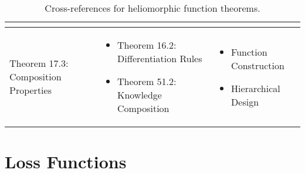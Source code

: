 \begin{table}[h]
\begin{tabular}{|l|p{7cm}|p{4cm}|}
\begin{itemize}
\end{itemize} \\
\hline
Theorem 17.3: Composition Properties &
\begin{itemize}
    \item Theorem 16.2: Differentiation Rules
    \item Theorem 51.2: Knowledge Composition
\end{itemize} &
\begin{itemize}
    \item Function Construction
    \item Hierarchical Design
\end{itemize} \\
\hline
\end{tabular}
\caption{Cross-references for heliomorphic function theorems.}
\label{tab:xref_heliomorphic}
\end{table}

\section{Loss Functions}

